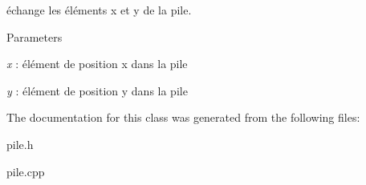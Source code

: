 échange les éléments x et y de la pile. 


\begin{DoxyParams}{Parameters}
\item[{\em x}]: élément de position x dans la pile \item[{\em y}]: élément de position y dans la pile \end{DoxyParams}


The documentation for this class was generated from the following files:\begin{DoxyCompactItemize}
\item 
pile.h\item 
pile.cpp\end{DoxyCompactItemize}
